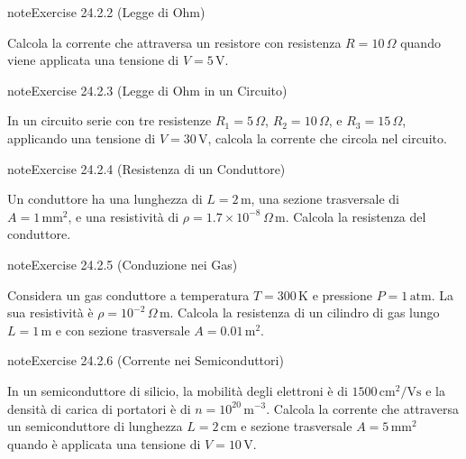 \documentclass[letterpaper,10pt,italian]{jupyterBook}
\begin{document}
\begin{sphinxadmonition}{note}{Exercise 24.2.2 (Legge di Ohm)}



\sphinxAtStartPar
Calcola la corrente che attraversa un resistore con resistenza \(R = 10 \, \Omega\) quando viene applicata una tensione di \(V = 5 \, \text{V}\).
\end{sphinxadmonition}
 \label{exercise:ch/electromagnetism/electric-current-problems-exercise-2}

\begin{sphinxadmonition}{note}{Exercise 24.2.3 (Legge di Ohm in un Circuito)}



\sphinxAtStartPar
In un circuito serie con tre resistenze \(R_1 = 5 \, \Omega\), \(R_2 = 10 \, \Omega\), e \(R_3 = 15 \, \Omega\), applicando una tensione di \(V = 30 \, \text{V}\), calcola la corrente che circola nel circuito.
\end{sphinxadmonition}
 \label{exercise:ch/electromagnetism/electric-current-problems-exercise-3}

\begin{sphinxadmonition}{note}{Exercise 24.2.4 (Resistenza di un Conduttore)}



\sphinxAtStartPar
Un conduttore ha una lunghezza di \(L = 2 \, \text{m}\), una sezione trasversale di \(A = 1 \, \text{mm}^2\), e una resistività di \(\rho = 1.7 \times 10^{-8} \, \Omega \, \text{m}\). Calcola la resistenza del conduttore.
\end{sphinxadmonition}
 \label{exercise:ch/electromagnetism/electric-current-problems-exercise-4}

\begin{sphinxadmonition}{note}{Exercise 24.2.5 (Conduzione nei Gas)}



\sphinxAtStartPar
Considera un gas conduttore a temperatura \(T = 300 \, \text{K}\) e pressione \(P = 1 \, \text{atm}\). La sua resistività è \(\rho = 10^{-2} \, \Omega \, \text{m}\). Calcola la resistenza di un cilindro di gas lungo \(L = 1 \, \text{m}\) e con sezione trasversale \(A = 0.01 \, \text{m}^2\).
\end{sphinxadmonition}
 \label{exercise:ch/electromagnetism/electric-current-problems-exercise-5}

\begin{sphinxadmonition}{note}{Exercise 24.2.6 (Corrente nei Semiconduttori)}



\sphinxAtStartPar
In un semiconduttore di silicio, la mobilità degli elettroni è di \(1500 \, \text{cm}^2/\text{V}\text{s}\) e la densità di carica di portatori è di \(n = 10^{20} \, \text{m}^{-3}\). Calcola la corrente che attraversa un semiconduttore di lunghezza \(L = 2 \, \text{cm}\) e sezione trasversale \(A = 5 \, \text{mm}^2\) quando è applicata una tensione di \(V = 10 \, \text{V}\).
\end{sphinxadmonition}
 \label{exercise:ch/electromagnetism/electric-current-problems-exercise-6}
\end{document}
